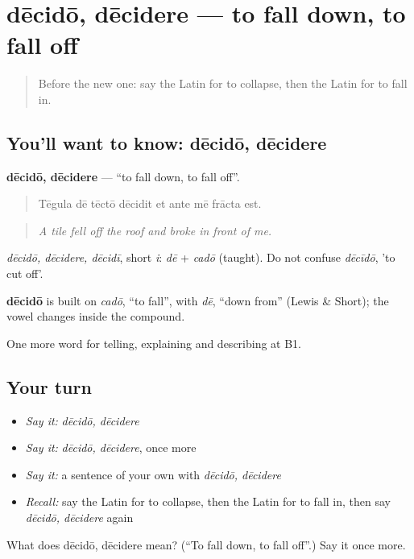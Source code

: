 \section[dēcidō, dēcidere]{dēcidō, dēcidere — to fall down, to fall off}

\label{lesson:LA-C313-decido}



\begin{quote}
Before the new one: say the Latin for to collapse, then the Latin for to fall in.
\end{quote}

\subsection*{You'll want to know: dēcidō, dēcidere}
\textbf{dēcidō, dēcidere} — \textquotedblleft{}to fall down, to fall off\textquotedblright{}.

\begin{quote}
Tēgula dē tēctō dēcidit et ante mē frācta est.
\end{quote}

\begin{quote}
\emph{A tile fell off the roof and broke in front of me.}
\end{quote}

\emph{dēcidō, dēcidere, dēcidī}, short \emph{i}: \emph{dē} + \emph{cadō} (taught). Do not confuse \emph{dēcīdō}, 'to cut off'.

\begin{cousinweb}
\textbf{dēcidō} is built on \emph{cadō}, \textquotedblleft{}to fall\textquotedblright{}, with \emph{dē}, \textquotedblleft{}down from\textquotedblright{} (Lewis \& Short); the vowel changes inside the compound.
\end{cousinweb}

\begin{grammarlens}[title={What you've built}]
One more word for telling, explaining and describing at B1.
\end{grammarlens}

\subsection*{Your turn}
\begin{itemize}
\raggedright
  \item \emph{Say it:} \emph{dēcidō, dēcidere}
  \item \emph{Say it:} \emph{dēcidō, dēcidere}, once more
  \item \emph{Say it:} a sentence of your own with \emph{dēcidō, dēcidere}
  \item \emph{Recall:} say the Latin for to collapse, then the Latin for to fall in, then say \emph{dēcidō, dēcidere} again
\end{itemize}

\begin{tcolorbox}[breakable,colback=teal!4,colframe=teal!35!black,title={Before you move on}]
What does dēcidō, dēcidere mean? (\textquotedblleft{}To fall down, to fall off\textquotedblright{}.) Say it once more.
\end{tcolorbox}
